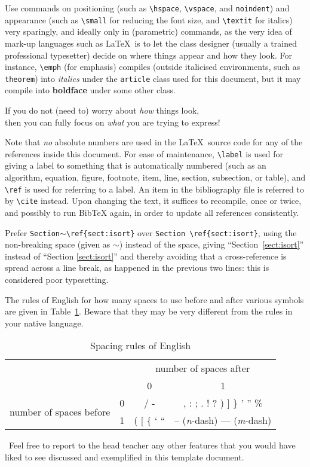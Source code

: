 \documentclass[a4paper,11pt]{article}
\newcommand{\red}[1]{{\color{red}#1}}
\newcommand{\handpoint}{\ding{43}}
\begin{document}
Use commands on positioning (such as \verb|\hspace|, \verb|\vspace|,
and \verb|noindent|) and appearance (such as \verb|\small| for
reducing the font size, and \verb|\textit| for italics) very
sparingly, and ideally only in (parametric) commands, as the very idea
of mark-up languages such as \LaTeX\ is to let the class designer
(usually a trained professional typesetter) decide on where things
appear and how they look.  For instance, \verb|\emph| (for emphasis)
compiles (outside italicised environments, such as \texttt{theorem})
into \textit{italics} under the \texttt{article} class used for this
document, but it may compile into \textbf{boldface} under some other
class.
\begin{center}
  \red{If you do not (need to) worry about \emph{how} things look, \\
    then you can fully focus on \emph{what} you are trying to
    express!}
\end{center}

Note that \emph{no} absolute numbers are used in the \LaTeX\ source
code for any of the references inside this document.  For ease of
maintenance, \verb|\label| is used for giving a label to something
that is automatically numbered (such as an algorithm, equation,
figure, footnote, item, line, section, subsection, or table), and
\verb|\ref| is used for referring to a label.  An item in the
bibliography file is referred to by \verb|\cite| instead.  Upon
changing the text, it suffices to recompile, once or twice, and
possibly to run BibTeX again, in order to update all references
consistently.

Prefer \verb|Section|$\sim$\verb|\ref{sect:isort}| over
\verb|Section \ref{sect:isort}|, using the non-breaking space (given
as $\sim$) instead of the space, giving ``Section~\ref{sect:isort}''
instead of ``Section \ref{sect:isort}'' and thereby avoiding that a
cross-reference is spread across a line break, as happened in the
previous two lines: this is considered poor typesetting.

The rules of English for how many spaces to use before and after
various symbols are given in Table~\ref{tab:spacing}.  Beware that
they may be very different from the rules in your native language.

\begin{table}[t]
  \centering
  \begin{tabular}{|c|c|c|c|}
    \cline{3-4}
    \multicolumn{2}{c|}{} & \multicolumn{2}{c|}{number of spaces after} \\
    \cline{3-4}
    \multicolumn{2}{c|}{} & 0 & 1 \\
    \hline
    \multirow{2}{*}{number of spaces before} & 0 & / - & , : ; . ! ?
    ) ] \} ' '' \% \\
    \cline{2-4}
    & 1 & ( [ \{ ` `` & -- (\emph{n}-dash) --- (\emph{m}-dash) \\
    \hline
  \end{tabular}
  \caption{Spacing rules of English}
  \label{tab:spacing}
\end{table}

\vfill

\noindent
\handpoint\ Feel free to report to the head teacher any other features
that you would have liked to see discussed and exemplified in this
template document.
\end{document}
